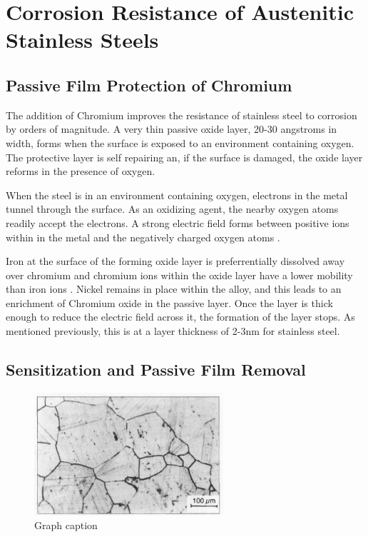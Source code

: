 \section{Corrosion Resistance of Austenitic Stainless Steels}



\subsection{Passive Film Protection of Chromium}

The addition of Chromium improves the resistance of stainless steel to corrosion by orders of magnitude.  A very thin passive oxide layer, 20-30 angstroms in width, forms when the surface is exposed to an environment containing oxygen.  The protective layer is self repairing an, if the surface is damaged, the oxide layer reforms in the presence of oxygen.

When the steel is in an environment containing oxygen, electrons in the metal tunnel through the surface.  As an oxidizing agent, the nearby oxygen atoms readily accept the electrons.  A strong electric field forms between positive ions within in the metal and the negatively charged oxygen atoms \cite{medicalmetals133}.  

Iron at the surface of the forming oxide layer is preferrentially dissolved away over chromium \cite{kirchheimcc} and chromium ions within the oxide layer have a lower mobility than iron ions \cite{kirchheimpassive}.  Nickel remains in place within the alloy, and this leads to an enrichment of Chromium oxide in the passive layer.  Once the layer is thick enough to reduce the electric field across it, the formation of the layer stops.  As mentioned previously, this is at a layer thickness of 2-3nm for stainless steel.




\subsection{Sensitization and Passive Film Removal}




\begin{figure}[tbp]
  \begin{center}
    \includegraphics[width=7.0cm]{chapters/background_austenitic_steels_in_nuclear/images/grainboundaries.png}
    \caption{Graph caption}
    \label{image:flux1}
  \end{center}
\end{figure}



